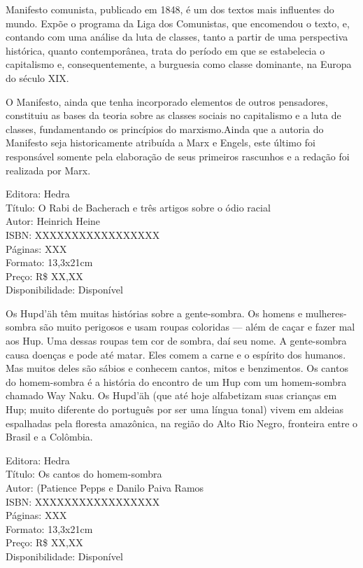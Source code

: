 \pagebreak


\noindent{}Manifesto comunista, publicado em 1848, é um dos textos mais influentes do mundo. Expõe o programa da Liga dos Comunistas, que encomendou o texto, e, contando com uma análise da luta de classes, tanto a partir de uma perspectiva histórica, quanto contemporânea, trata do período em que se estabelecia o capitalismo e, consequentemente, a burguesia como classe dominante, na Europa do século XIX.

O Manifesto, ainda que tenha incorporado elementos de outros pensadores, constituiu as bases da teoria sobre as classes sociais no capitalismo e a luta de classes, fundamentando os princípios do marxismo.Ainda que a autoria do Manifesto seja historicamente atribuída a Marx e Engels, este último foi responsável somente pela elaboração de seus primeiros rascunhos e a redação foi realizada por Marx.

\begin{ficha}
Editora: Hedra\\
Título: O Rabi de Bacherach e três artigos sobre o ódio racial\\
Autor: Heinrich Heine\\ 
ISBN: XXXXXXXXXXXXXXXXX\\
Páginas: XXX\\
Formato: 13,3x21cm\\
Preço: R\$ XX,XX\\
Disponibilidade: Disponível
\end{ficha}

\pagebreak


\noindent{}Os Hupd’äh têm muitas histórias sobre a gente-sombra. Os homens e mulheres-sombra são muito perigosos e usam roupas coloridas — além de caçar e fazer mal aos Hup. Uma dessas roupas tem cor de sombra, daí seu nome. A gente-sombra causa doenças e pode até matar. Eles comem a carne e o espírito dos humanos. Mas muitos deles são sábios e conhecem cantos, mitos e benzimentos. Os cantos do homem-sombra é a história do encontro de um Hup com um homem-sombra chamado Way Naku. Os Hupd’äh (que até hoje alfabetizam suas crianças em Hup; muito diferente do português por ser uma língua tonal) vivem em aldeias espalhadas pela floresta amazônica, na região do Alto Rio Negro, fronteira entre o Brasil e a Colômbia.


\begin{ficha}
Editora: Hedra\\
Título: Os cantos do homem-sombra\\
Autor: (Patience Pepps e Danilo Paiva Ramos\\ 
ISBN: XXXXXXXXXXXXXXXXX\\
Páginas: XXX\\
Formato: 13,3x21cm\\
Preço: R\$ XX,XX\\
Disponibilidade: Disponível
\end{ficha}

